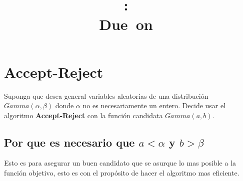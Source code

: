 \documentclass{article}
\title{
	\vspace{2in}
	\textmd{\textbf{\hmwkClass:\ \hmwkTitle}}\\
	\normalsize\vspace{0.1in}\small{Due\ on\ \hmwkDueDate}\\
	\vspace{0.1in}\large{\textit{\hmwkClassInstructor}}
	\vspace{3in}
}
\author{\hmwkAuthorName}
\date{}
\begin{document}
\maketitle
\pagebreak
\tableofcontents
\pagebreak

\section{Accept-Reject}
Suponga que desea general variables aleatorias de una distribución $Gamma(\alpha, \beta)$ donde
$\alpha$ no es necesariamente un entero. Decide usar el algoritmo \textbf{Accept-Reject} con la función candidata $Gamma(a,b)$.

\subsection{Por que es necesario que $a < \alpha$ y $b> \beta$}
Esto es para asegurar un buen candidato que se asurque lo mas posible a la función objetivo, esto es con el propósito de
hacer el algoritmo mas eficiente.
\end{document}
